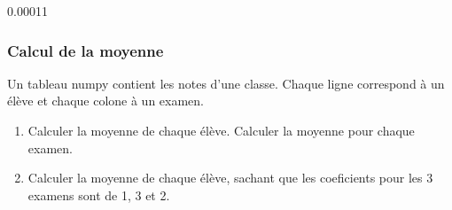 \documentclass[letterpaper,10pt,english]{sphinxhowto}
\begin{document}
\begin{sphinxVerbatim}[commandchars=\\\{\}]
  

   

   
\end{sphinxVerbatim}

\begin{sphinxVerbatim}[commandchars=\\\{\}]
0.00011
\end{sphinxVerbatim}


\subsubsection{Calcul de la moyenne}
\label{\detokenize{cours5_numpy_corr_exercices:calcul-de-la-moyenne}}
\sphinxAtStartPar
Un tableau numpy contient les notes d’une classe. Chaque ligne correspond à un élève et chaque colone à un examen.

\begin{sphinxVerbatim}[commandchars=\\\{\}]
   

  
  

   
\end{sphinxVerbatim}
\begin{enumerate}
%
\item {} 
\sphinxAtStartPar
Calculer la moyenne de chaque élève. Calculer la moyenne pour chaque examen.

\item {} 
\sphinxAtStartPar
Calculer la moyenne de chaque élève, sachant que les coeficients pour les 3 examens sont de 1, 3 et 2.

\end{enumerate}
\end{document}
